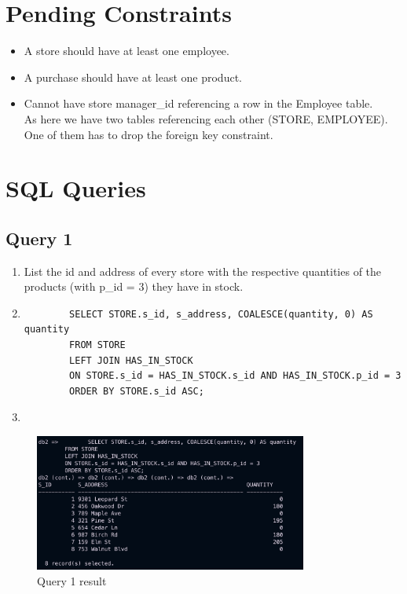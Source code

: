 \documentclass[a4paper,11pt]{article}
\begin{document}
\section{Pending Constraints}
\begin{itemize}
    \item A store should have at least one employee.
    \item A purchase should have at least one product.
    \item Cannot have store manager\_id referencing a row in the Employee table.\\
        As here we have two tables referencing each other (STORE, EMPLOYEE).\\
        One of them has to drop the foreign key constraint.

\end{itemize}

\section{SQL Queries}
\subsection*{Query 1}
\begin{enumerate}[label=(\alph*)]
    \item List the id and address of every store with the respective quantities of the products (with p\_id = 3) they have in stock.
    \item
        \begin{lstlisting}
        SELECT STORE.s_id, s_address, COALESCE(quantity, 0) AS quantity
        FROM STORE
        LEFT JOIN HAS_IN_STOCK
        ON STORE.s_id = HAS_IN_STOCK.s_id AND HAS_IN_STOCK.p_id = 3
        ORDER BY STORE.s_id ASC;
        \end{lstlisting}
    \item
\end{enumerate}
\begin{figure}[H]
    \centering
    \includegraphics[width=0.8\textwidth]{query1.png}
    \caption{Query 1 result}
\end{figure}
\end{document}
